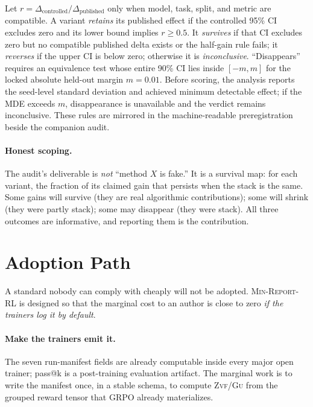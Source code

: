 \documentclass[11pt]{article}
\newcommand{\zvf}{\textsc{Zvf}}
\newcommand{\gu}{\textsc{Gu}}
\newcommand{\minreport}{\textsc{Min-Report-RL}}
\begin{document}
Let $r=\Delta_{\mathrm{controlled}}/\Delta_{\mathrm{published}}$ only when
model, task, split, and metric are compatible. A variant \emph{retains} its
published effect if the controlled 95\% CI excludes zero and its lower bound
implies $r\ge0.5$. It \emph{survives} if that CI excludes zero but no compatible
published delta exists or the half-gain rule fails; it \emph{reverses} if the
upper CI is below zero; otherwise it is \emph{inconclusive}.
``Disappears'' requires an equivalence test whose entire 90\% CI lies inside
$[-m,m]$ for the locked absolute held-out margin $m=0.01$. Before scoring,
the analysis reports the seed-level standard deviation and achieved minimum
detectable effect; if the MDE exceeds $m$, disappearance is unavailable and the
verdict remains inconclusive. These rules are mirrored in the machine-readable
preregistration beside the companion audit.

\paragraph{Honest scoping.}
The audit's deliverable is \emph{not} ``method $X$ is fake.'' It is a survival
map: for each variant, the fraction of its claimed gain that persists when the
stack is the same. Some gains will survive (they are real algorithmic
contributions); some will shrink (they were partly stack); some may disappear
(they were stack). All three outcomes are informative, and reporting them is
the contribution.

\section{Adoption Path}
\label{sec:adoption}


A standard nobody can comply with cheaply will not be adopted. \minreport{} is
designed so that the marginal cost to an author is close to zero \emph{if the
trainers log it by default}.

\paragraph{Make the trainers emit it.}
The seven run-manifest fields are already computable inside every major open
trainer; pass@k is a post-training evaluation artifact. The marginal work is
to write the manifest once, in a stable schema, to compute
\zvf{}/\gu{} from the grouped reward tensor that GRPO already materializes.
\end{document}
